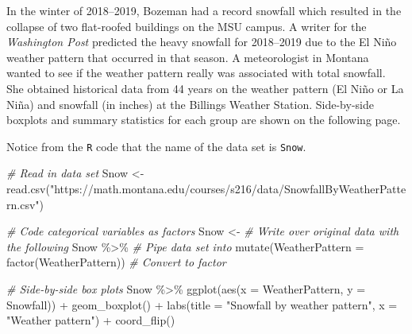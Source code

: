 \documentclass[
]{report}
\newenvironment{Shaded}{\begin{snugshade}}{\end{snugshade}}
\newcommand{\AttributeTok}[1]{\textcolor[rgb]{0.77,0.63,0.00}{#1}}
\newcommand{\CommentTok}[1]{\textcolor[rgb]{0.56,0.35,0.01}{\textit{#1}}}
\newcommand{\FunctionTok}[1]{\textcolor[rgb]{0.00,0.00,0.00}{#1}}
\newcommand{\NormalTok}[1]{#1}
\newcommand{\OtherTok}[1]{\textcolor[rgb]{0.56,0.35,0.01}{#1}}
\newcommand{\SpecialCharTok}[1]{\textcolor[rgb]{0.00,0.00,0.00}{#1}}
\newcommand{\StringTok}[1]{\textcolor[rgb]{0.31,0.60,0.02}{#1}}
\newcommand\latexcode[1]{#1}
\begin{document}
In the winter of 2018--2019, Bozeman had a record snowfall which resulted in the collapse of two flat-roofed buildings on the MSU campus. A writer for the \emph{Washington Post} predicted the heavy snowfall for 2018--2019 due to the El Ni\latexcode{\~{n}}o weather pattern that occurred in that season. A meteorologist in Montana wanted to see if the weather pattern really was associated with total snowfall. She obtained historical data from 44 years on the weather pattern (El Ni\latexcode{\~{n}}o or La Ni\latexcode{\~{n}}a) and snowfall (in inches) at the Billings Weather Station. Side-by-side boxplots and summary statistics for each group are shown on the following page.

Notice from the \texttt{R} code that the name of the data set is \texttt{Snow}.

\begin{Shaded}
\begin{Highlighting}[]
\CommentTok{\# Read in data set}
\NormalTok{Snow }\OtherTok{\textless{}{-}} \FunctionTok{read.csv}\NormalTok{(}\StringTok{"https://math.montana.edu/courses/s216/data/SnowfallByWeatherPattern.csv"}\NormalTok{)}

\CommentTok{\# Code categorical variables as factors}
\NormalTok{Snow }\OtherTok{\textless{}{-}} \CommentTok{\# Write over original data with the following}
\NormalTok{  Snow }\SpecialCharTok{\%\textgreater{}\%} \CommentTok{\# Pipe data set into}
  \FunctionTok{mutate}\NormalTok{(}\AttributeTok{WeatherPattern =} \FunctionTok{factor}\NormalTok{(WeatherPattern)) }\CommentTok{\# Convert to factor}
\end{Highlighting}
\end{Shaded}

\newpage

\begin{Shaded}
\begin{Highlighting}[]
\CommentTok{\# Side{-}by{-}side box plots}
\NormalTok{Snow }\SpecialCharTok{\%\textgreater{}\%}
\FunctionTok{ggplot}\NormalTok{(}\FunctionTok{aes}\NormalTok{(}\AttributeTok{x =}\NormalTok{ WeatherPattern, }\AttributeTok{y =}\NormalTok{ Snowfall)) }\SpecialCharTok{+}
    \FunctionTok{geom\_boxplot}\NormalTok{() }\SpecialCharTok{+} 
    \FunctionTok{labs}\NormalTok{(}\AttributeTok{title =} \StringTok{"Snowfall by weather pattern"}\NormalTok{,}
         \AttributeTok{x =} \StringTok{"Weather pattern"}\NormalTok{) }\SpecialCharTok{+}
    \FunctionTok{coord\_flip}\NormalTok{()}
\end{Highlighting}
\end{Shaded}
\end{document}
